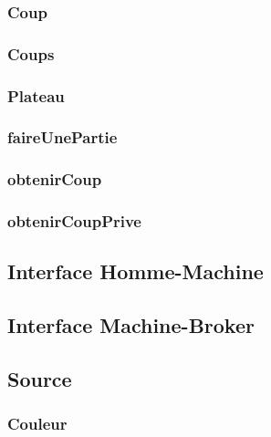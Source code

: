 \documentclass{article}
\begin{document}
\subsubsection{Coup}


\subsubsection{Coups}


\subsubsection{Plateau}


\subsubsection{faireUnePartie}


\subsubsection{obtenirCoup}


\subsubsection{obtenirCoupPrive}


\subsection{Interface Homme-Machine}


\subsection{Interface Machine-Broker}


\subsection{Source}

\subsubsection{Couleur}

\end{document}
